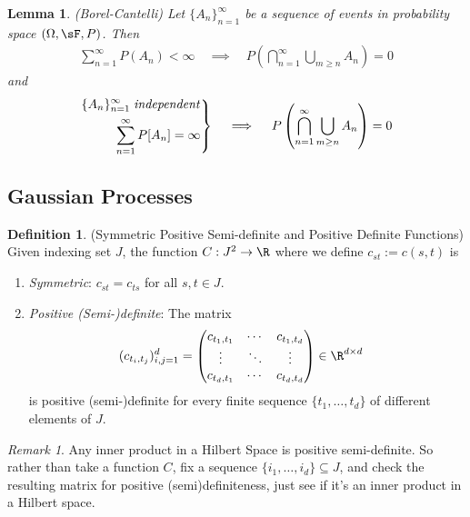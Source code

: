 \documentclass[12pt]{article}
\theoremstyle{plain}
\newtheorem{lem}[thm]{Lemma}
\theoremstyle{definition}
\newtheorem{defn}[thm]{Definition}
\theoremstyle{remark}
\newtheorem*{rmk}{Remark}
\newcommand{\ra}{\rightarrow}
\newenvironment{rcases}
  {\left.\begin{aligned}}
  {\end{aligned}\right\rbrace}
\newcommand{\sumninf}{\sum^\infty_{n=1}}
\newcommand{\ninf}{_{n=1}^\infty}
\begin{document}
\begin{lem}\emph{(Borel-Cantelli)}
Let $\{A_n\}\ninf$ be a sequence of events in probability space
$(\Omega,\sF,P)$. Then
\begin{align*}
  \sumninf P(A_n) < \infty
  \quad\implies\quad
  P\left(\bigcap\ninf \bigcup_{m\geq n} A_n\right) = 0
\end{align*}
and
\begin{align*}
  \begin{rcases}
    \{A_n\}\ninf \; \text{\emph{independent}}\\
    \sumninf P[A_n] = \infty
  \end{rcases}
  \quad\implies\quad
  P\left(\bigcap\ninf \bigcup_{m\geq n} A_n\right) = 0
\end{align*}
\end{lem}

\clearpage
\subsection{Gaussian Processes}

\begin{defn}
(Symmetric Positive Semi-definite and Positive Definite Functions)
Given indexing set $J$, the function $C:J^2 \ra \R$ where we define
$c_{st}:=c(s,t)$ is
\begin{enumerate}
  \item \emph{Symmetric}: $c_{st}=c_{ts}$ for all $s,t \in J$.
  \item \emph{Positive (Semi-)definite}: The matrix
    \begin{align*}
      (c_{t_i,t_j})^d_{i,j=1}
      &=
      \begin{pmatrix}
        c_{t_1,t_1} &\cdots & c_{t_1,t_d} \\
        \vdots &\ddots & \vdots \\
        c_{t_d,t_1} &\cdots & c_{t_d,t_d} \\
      \end{pmatrix}
      \in \R^{d\times d}
    \end{align*}
    is positive (semi-)definite for every finite sequence
    $\{t_1,\ldots,t_d\}$ of different elements of $J$.
\end{enumerate}
\end{defn}

\begin{rmk}
Any inner product in a Hilbert Space is positive semi-definite. So
rather than take a function $C$, fix a sequence
$\{i_1,\ldots,i_d\}\subseteq J$, and check the resulting matrix for
positive (semi)definiteness, just see if it's an inner product in a
Hilbert space.
\end{rmk}
\end{document}
